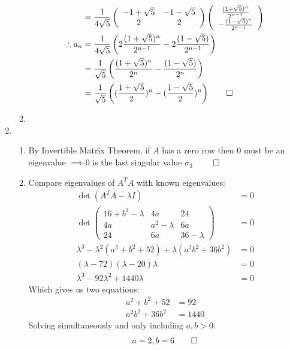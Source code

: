 \documentclass[12pt, a4paper]{article}
\begin{document}
\begin{enumerate}[Q\arabic*.]
\begin{enumerate}[(\alph*)]
\begin{align*}
                                                                &= \frac{1}{4\sqrt{5}}\left(\begin{array}{cc} -1+\sqrt{5} & -1-\sqrt{5}\\ 2 & 2\end{array}\right) \left(\begin{array}{c} \frac{(1+\sqrt{5})^{n}}{2^{n-1}}\\ -\frac{(1-\sqrt{5})^n}{2^{n-1}} \end{array}\right)\\
        \therefore a_n &= \frac{1}{4\sqrt{5}}\left(2\frac{(1+\sqrt{5})^n}{2^{n-1}} - 2 \frac{(1-\sqrt{5})}{2^{n-1}}\right)\\
                       &= \frac{1}{\sqrt{5}}\left(\frac{(1+\sqrt{5})^n}{2^n} - \frac{(1-\sqrt{5})}{2^n}\right)\\
                       &= \frac{1}{\sqrt{5}}\left((\frac{1+\sqrt{5}}{2})^n - (\frac{1-\sqrt{5}}{2})^n\right)\qed\\
      \end{align*}

    \item
  \end{enumerate}
  \pagebreak

  \item
    \begin{enumerate}[(\alph*)]
      \item By Invertible Matrix Theorem, if $A$ has a zero row then $0$ must be an eigenvalue $\implies 0$ is the last singular value $\sigma_3$ $\qed$

      \item Compare eigenvalues of $A^TA$ with known eigenvalues:
        \begin{align*}
          \det(A^TA - \lambda I) &= 0\\
          \det\left(\begin{array}{ccc} 16+b^2-\lambda & 4a & 24\\ 4a & a^2-\lambda & 6a\\ 24 & 6a & 36-\lambda \end{array}\right) &= 0\\
          \lambda^3 - \lambda^2(a^2+b^2+52) + \lambda(a^2b^2 + 36b^2) &= 0\\
          (\lambda - 72)(\lambda - 20)\lambda &= 0\tag*{(Known)}\\
          \lambda^3 - 92\lambda^2 + 1440\lambda &= 0
        \end{align*}
        Which gives us two equations:
        \begin{align*}
          a^2+b^2+52 &= 92\tag*{(1)}\\
          a^2b^2 + 36b^2 &= 1440\tag*{(2)}
        \end{align*}
        Solving simultaneously and only including $a,b>0$:
        \begin{align*}
          a=2, b=6\qed
        \end{align*}


\end{enumerate}
\end{enumerate}
\end{document}
